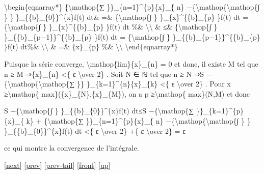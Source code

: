 \documentclass[]{article}
\begin{document}
\textbackslash{}begin\{eqnarray*\} \textbar{}\{\textbackslash{}mathop\{∑
\}\}\_\{n=1\}\^{}\{p\}\{x\}\_\{ n\}
−\{\textbackslash{}mathop\{\textbackslash{}mathop\{∫ \} \}
\}\_\{\{b\}\_\{0\}\}\^{}\{x\}f(t) dt\textbar{}\& =\&
\textbar{}\{\textbackslash{}mathop\{∫ \} \}\_\{x\}\^{}\{\{b\}\_\{p\}
\}f(t) dt\textbar{} =\{\textbackslash{}mathop\{∫ \}
\}\_\{x\}\^{}\{\{b\}\_\{p\} \}\textbar{}f(t)\textbar{} dt \%\&
\textbackslash{}\textbackslash{} \& ≤\& \{\textbackslash{}mathop\{∫ \}
\}\_\{\{b\}\_\{p−1\}\}\^{}\{\{b\}\_\{p\} \}\textbar{}f(t)\textbar{} dt =
\textbar{}\{\textbackslash{}mathop\{∫ \}
\}\_\{\{b\}\_\{p−1\}\}\^{}\{\{b\}\_\{p\} \}f(t) dt\textbar{}\%\&
\textbackslash{}\textbackslash{} \& =\& \textbar{}\{x\}\_\{p\}\textbar{}
\%\& \textbackslash{}\textbackslash{} \textbackslash{}end\{eqnarray*\}

Puisque la série converge, \textbackslash{}mathop\{lim\}\{x\}\_\{n\} = 0
et donc, il existe M tel que n ≥ M ⇒\textbar{}\{x\}\_\{n\}\textbar{}
\textless{}\{ ε \textbackslash{}over 2\} . Soit N ∈ ℕ tel que n ≥ N
⇒\textbar{}S −\{\textbackslash{}mathop\{\textbackslash{}mathop\{∑ \}\}
\}\_\{k=1\}\^{}\{n\}\{x\}\_\{k\}\textbar{} \textless{}\{ ε
\textbackslash{}over 2\} . Pour x ≥\textbackslash{}mathop\{
max\}(\{x\}\_\{N\},\{x\}\_\{M\}), on a p ≥\textbackslash{}mathop\{
max\}(N,M) et donc

\textbar{}S −\{\textbackslash{}mathop\{∫ \}
\}\_\{\{b\}\_\{0\}\}\^{}\{x\}f(t) dt\textbar{}≤\textbar{}S
−\{\textbackslash{}mathop\{∑ \}\}\_\{k=1\}\^{}\{p\}\{x\}\_\{
k\}\textbar{} + \textbar{}\{\textbackslash{}mathop\{∑
\}\}\_\{n=1\}\^{}\{p\}\{x\}\_\{ n\}
−\{\textbackslash{}mathop\{\textbackslash{}mathop\{∫ \} \}
\}\_\{\{b\}\_\{0\}\}\^{}\{x\}f(t) dt\textbar{} \textless{}\{ ε
\textbackslash{}over 2\} +\{ ε \textbackslash{}over 2\} = ε

ce qui montre la convergence de l'intégrale.

{[}\href{coursse58.html}{next}{]} {[}\href{coursse56.html}{prev}{]}
{[}\href{coursse56.html\#tailcoursse56.html}{prev-tail}{]}
{[}\href{coursse57.html}{front}{]}
{[}\href{coursch10.html\#coursse57.html}{up}{]}
\end{document}
